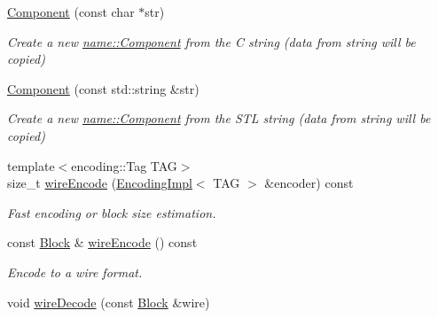 \begin{DoxyCompactItemize}
\hyperlink{classndn_1_1name_1_1Component_a3c47893a929db1f777292dd0831546c8}{Component} (const char $\ast$str)
\begin{DoxyCompactList}\small\item\em Create a new \hyperlink{classndn_1_1name_1_1Component}{name\+::\+Component} from the C string (data from string will be copied) \end{DoxyCompactList}\item 
\hyperlink{classndn_1_1name_1_1Component_aaae6517ff81fb1e085dc2e441c1d13e7}{Component} (const std\+::string \&str)
\begin{DoxyCompactList}\small\item\em Create a new \hyperlink{classndn_1_1name_1_1Component}{name\+::\+Component} from the S\+TL string (data from string will be copied) \end{DoxyCompactList}\item 
{\footnotesize template$<$encoding\+::\+Tag T\+AG$>$ }\\size\+\_\+t \hyperlink{classndn_1_1name_1_1Component_abbfde2552812b1f51420a30655d92871}{wire\+Encode} (\hyperlink{classndn_1_1encoding_1_1EncodingImpl}{Encoding\+Impl}$<$ T\+AG $>$ \&encoder) const\hypertarget{classndn_1_1name_1_1Component_abbfde2552812b1f51420a30655d92871}{}\label{classndn_1_1name_1_1Component_abbfde2552812b1f51420a30655d92871}

\begin{DoxyCompactList}\small\item\em Fast encoding or block size estimation. \end{DoxyCompactList}\item 
const \hyperlink{classndn_1_1Block}{Block} \& \hyperlink{classndn_1_1name_1_1Component_a0e872178143798b34a57cdd092e98d4f}{wire\+Encode} () const\hypertarget{classndn_1_1name_1_1Component_a0e872178143798b34a57cdd092e98d4f}{}\label{classndn_1_1name_1_1Component_a0e872178143798b34a57cdd092e98d4f}

\begin{DoxyCompactList}\small\item\em Encode to a wire format. \end{DoxyCompactList}\item 
void \hyperlink{classndn_1_1name_1_1Component_ab50fb587f611071ea6695f4dbe3a286c}{wire\+Decode} (const \hyperlink{classndn_1_1Block}{Block} \&wire)\hypertarget{classndn_1_1name_1_1Component_ab50fb587f611071ea6695f4dbe3a286c}{}\label{classndn_1_1name_1_1Component_ab50fb587f611071ea6695f4dbe3a286c}


\end{DoxyCompactItemize}
